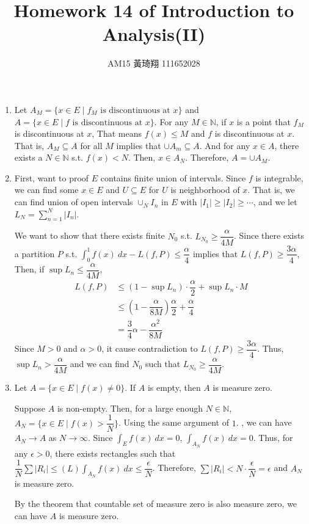 \documentclass[12pt]{article}
\title{Homework 14 of Introduction to Analysis(II)}
\author{AM15 黃琦翔 111652028}
\begin{document}
\maketitle
\begin{enumerate}
    \item Let $A_M = \{x \in E \mid f_M\text{ is discontinuous at } x\}$ and $A = \{ x\in E \mid f\text{ is discontinuous at } x\}$.
    For any $M \in \mathbb{N}$, if $x$ is a point that $f_M$ is discontinuous at $x$, 
    That means $f(x) \leq M$ and $f$ is discontinuous at $x$.
    That is, $A_M \subseteq A$ for all $M$ implies that $\cup A_m \subseteq A$.
    And for any $x \in A$, there exists a $N \in \mathbb{N}$ s.t. $f(x) < N$.
    Then, $x \in A_N$.
    Therefore, $A = \cup A_M$.

    \item First, want to proof $E$ contains finite union of intervals.
    Since $f$ is integrable, we can find some $x \in E$ and $U\subseteq E$ for $U$ is neighborhood of $x$.
    That is, we can find union of open intervals $\cup_N I_n$ in $E$ with $|I_1| \geq |I_2|\geq \cdots$, and we let $L_N = \displaystyle\sum_{n=1}^N|I_n|$.
    
    We want to show that there exists finite $N_0$ s.t. $L_{N_0} \geq \dfrac{\alpha}{4M}$.
    Since there exists a partition $P$ s.t. $\displaystyle\int_{0}^{1} f(x)\ dx - L(f, P) \leq \dfrac{\alpha}{4}$ implies that $L(f, P) \geq \dfrac{3\alpha}{4}$,
    Then, if $\sup L_n \leq \dfrac{\alpha}{4M}$, \begin{align*}
        L(f, P) &\leq (1-\sup L_n) \cdot \dfrac{\alpha}{2} + \sup L_n \cdot M\\
        &\leq (1-\dfrac{\alpha}{8M})\dfrac{\alpha}{2} + \dfrac{\alpha}{4}\\
        &= \dfrac{3}{4}\alpha - \dfrac{\alpha^2}{8M}
    \end{align*}
    Since $M > 0$ and $\alpha > 0$, it cause contradiction to $L(f, P) \geq \dfrac{3\alpha}{4}$.
    Thus, $\sup L_n > \dfrac{\alpha}{4M}$ and we can find $N_0$ such that $L_{N_0} \geq \dfrac{\alpha}{4M}$.
    
    \newpage
    \item Let $A = \{x \in E\mid f(x)\neq 0\}$. If $A$ is empty, then $A$ is measure zero.
    
    Suppose $A$ is non-empty.
    Then, for a large enough $N\in \mathbb{N}$, $A_N = \{x\in E\mid f(x) > \dfrac{1}{N}\}$.
    Using the same argument of $1$. , we can have $A_N \to A$ as $N \to \infty$.
    Since $\displaystyle\int_{E} f(x)\ dx = 0$, $\displaystyle\int_{A_N} f(x)\ dx = 0$.
    Thus, for any $\epsilon > 0$, there exists rectangles such that $\dfrac{1}{N}\sum |R_i| \leq (L)\displaystyle\int_{A_N} f(x)\ dx \leq \dfrac{\epsilon}{N}$.
    Therefore, $\sum |R_i| < N \cdot \dfrac{\epsilon}{N} = \epsilon$ and $A_N$ is measure zero.
    
    By the theorem that countable set of measure zero is also measure zero, we can have $A$ is measure zero.
\end{enumerate}
\end{document}
